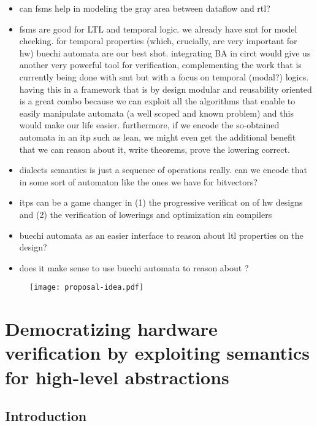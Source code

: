 \documentclass[]{article}
\begin{document}
\begin{itemize}
    \item can fsms help in modeling the gray area between dataflow and rtl?
    \item fsms are good for LTL and temporal logic. we already have smt for model checking. for temporal properties (which, crucially, are very important for hw) buechi automata are our best shot. 
        integrating BA in circt would give us another very powerful tool for verification, complementing the work that is currently being done with smt but with a focus on temporal (modal?) logics. 
        having this in a framework that is by design modular and reusability oriented is a great combo because we can exploit all the algorithms that enable to easily manipulate automata (a well scoped and known problem)
        and this would make our life easier. furthermore, if we encode the so-obtained automata in an itp such as lean, we might even get the additional benefit that we can reason about it, write theorems, 
        prove the lowering correct. 
    \item dialects semantics is just a sequence of operations really. can we encode that in some sort of automaton like the ones we have for bitvectors? 
    \item itps can be a game changer in (1) the progressive verificat on of hw designs and (2) the verification of lowerings and optimization sin compilers
    \item buechi automata as an easier interface to reason about ltl properties on the design?
    \item does it make sense to use buechi automata to reason about ?
\end{itemize}

\begin{figure}
    \centering 
    \texttt{[image: proposal-idea.pdf]}
\end{figure}

\newpage

\section{Democratizing hardware verification by exploiting semantics for high-level abstractions}


\subsection{Introduction}
\end{document}
